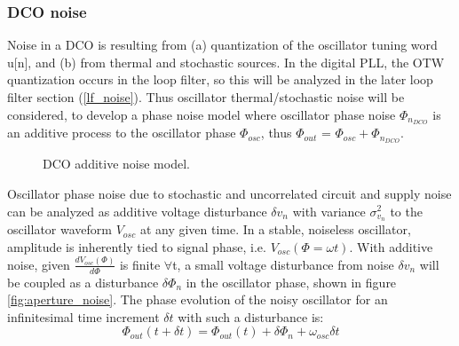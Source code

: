 	\subsubsection{DCO noise}
		Noise in a DCO is resulting from (a) quantization of the oscillator tuning word u[n], and (b) from thermal and stochastic sources. In the digital PLL, the OTW quantization occurs in the loop filter, so this will be analyzed in the later loop filter section (\ref{lf_noise}). Thus oscillator thermal/stochastic noise will be considered, to develop a phase noise model where oscillator phase noise $\Phi_{n_{DCO}}$ is an additive process to the oscillator phase $\Phi_{osc}$, thus $\Phi_{out}$ = $\Phi_{osc} + \Phi_{n_{DCO}}$.

		\begin{figure}[htb!]
			\center
			\caption{DCO additive noise model.}
			\label{fig:dco_noise}
		\end{figure}
		\FloatBarrier

		 Oscillator phase noise due to stochastic and uncorrelated circuit and supply noise can be analyzed as additive voltage disturbance $\delta v_n$ with variance $\sigma_{v_n}^2$ to the oscillator waveform $V_{osc}$ at any given time.  In a stable, noiseless oscillator, amplitude is inherently tied to signal phase, i.e. $V_{osc}(\Phi=\omega t)$. With additive noise, given $\frac{dV_{osc}(\Phi)}{d\Phi}$ is finite $\forall$t, a small voltage disturbance from noise $\delta v_{n}$ will be coupled as a disturbance $\delta\Phi_{n}$ in the oscillator phase, shown in figure \ref{fig:aperture_noise}. The phase evolution of the noisy oscillator for an infinitesimal time increment $\delta t$  with such a disturbance is:
		 \begin{equation}
			\Phi_{out}(t+\delta t) = \Phi_{out}(t) + \delta\Phi_n + \omega_{osc}\delta t \label{eq:rwalk_ph}
		 \end{equation}

